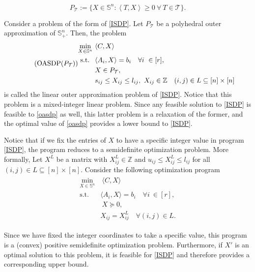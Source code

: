 \documentclass{article}
\begin{document}
\[
P_{\mathcal{T}} :=  \{X \in \mathbb{S}^n : \left \langle T, X \right \rangle \geq 0  \ \forall \ T \in \mathcal{T}\}.
\]

Consider a problem of the form of \eqref{ISDP}. Let $P_{\mathcal{T}}$ be a polyhedral outer approximation of $\mathbb{S}^n_+$. Then, the problem
\begin{gather}\label{oasdp}\tag{OASDP($P_{\mathcal{T}}$)}
\begin{aligned}
\min_{X \in \mathbb{S}^n }  \ & \langle  C,X\rangle \\
\text{ s.t. }\ & \langle A_i,X \rangle = b_i \quad \forall i \ \in [r], \\ 
&  X \in P_{\mathcal{T}}, \\
&  s_{ij} \leq X_{ij} \leq l_{ij} , \ X_{ij}\in \mathbb{Z} \quad (i,j)\in L\subseteq [n]\times[n]
\end{aligned}
\end{gather}
is called the linear outer approximation problem of \eqref{ISDP}. Notice that this problem is a mixed-integer linear problem. Since any feasible solution to \eqref{ISDP} is feasible to \eqref{oasdp} as well, this latter problem is a relaxation of the former, and the optimal value of \eqref{oasdp} provides a lower bound to \eqref{ISDP}.



Notice that if we fix the entries of $X$ to have a specific integer value in program \eqref{ISDP}, the program reduces to a semidefinite optimization problem. More formally,
Let $X^L$ be a matrix with $X^L_{ij} \in \mathbb{Z}$ and $u_{ij}\leq X^L_{ij} \leq l_{ij}$ for all $(i,j) \in L \subseteq [n]\times [n]$. Consider the following optimization program
\begin{gather}\label{inner_sdp}\tag{SDP($X^L$)}
\begin{aligned}
\min_{X \in \mathbb{S}^n }  & \  \langle  C,X\rangle \\
\text{s.t. } & \langle A_i,X \rangle = b_i  \quad \forall i \ \in [r],  \\
& \ X \succeq 0, \\ 
& X_{ij} = X^L_{ij} \quad \forall (i,j) \in L.
\end{aligned}
\end{gather}

Since we have fixed the integer coordinates to take a specific value, this program is a (convex) positive semidefinite optimization problem. Furthermore, if $X'$ is an optimal solution to this problem, it is feasible for \eqref{ISDP} and therefore provides a corresponding upper bound. 
\end{document}
